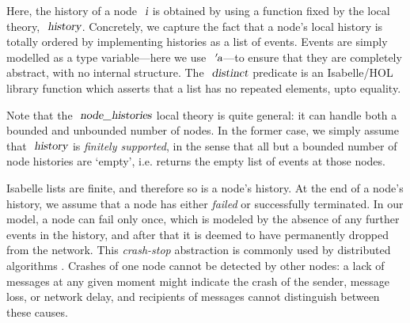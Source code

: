 \documentclass[acmlarge,review,anonymous]{acmart}\settopmatter{printfolios=true}
\begin{document}
\vspace{\baselineskip}
Here, the history of a node $\isa{i}$ is obtained by using a function fixed by the local theory, $\isa{history}$.
Concretely, we capture the fact that a node's local history is totally ordered by implementing histories as a list of events.
Events are simply modelled as a type variable---here we use $\isa{{\isacharprime}a}$---to ensure that they are completely abstract, with no internal structure.
The $\isa{distinct}$ predicate is an Isabelle/HOL library function which asserts that a list has no repeated elements, upto equality.

Note that the $\isa{node{\isacharunderscore}histories}$ local theory is quite general: it can handle both a bounded and unbounded number of nodes.
In the former case, we simply assume that $\isa{history}$ is \emph{finitely supported}, in the sense that all but a bounded number of node histories are `empty', i.e. returns the empty list of events at those nodes.

Isabelle lists are finite, and therefore so is a node's history.
At the end of a node's history, we assume that a node has either \emph{failed} or successfully terminated.
In our model, a node can fail only once, which is modeled by the absence of any further events in the history, and after that it is deemed to have permanently dropped from the network.
This \emph{crash-stop} abstraction is commonly used by distributed algorithms \cite{Cachin:2011wt}.
Crashes of one node cannot be detected by other nodes: a lack of messages at any given moment might indicate the crash of the sender, message loss, or network delay, and recipients of messages cannot distinguish between these causes.
\end{document}
